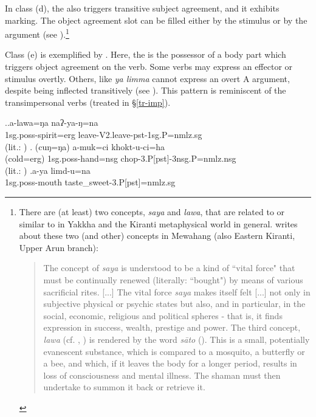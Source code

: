 In class (d), the  also triggers transitive subject agreement, and it exhibits  marking. The object agreement slot can be filled either by  the stimulus  or by the  argument (see \Next[a]).\footnote{There are (at least) two concepts, \emph{saya} and \emph{lawa}, that are related to or similar to  in Yakkha and the Kiranti metaphysical world in general.  \citet{Gaenszle2000Origins} writes about these two (and other) concepts in Mewahang (also Eastern Kiranti, Upper Arun branch): 

\begin{quote}
The concept of \emph{saya} is understood to be a kind of “vital force" that must be continually renewed (literally: “bought") by means of various sacrificial rites. [...] The vital force \emph{saya} makes itself felt [...] not only in subjective physical or psychic states but also, and in particular, in the social, economic, religious and political spheres - that is, it finds expression in success, wealth, prestige and power. The third concept, \emph{lawa} (cf. \citet[165]{Hardman1981The-psychology}, \citet[299]{Hardman_phd_Conformity}) is rendered by the  word \emph{sāto} (). This is a small, potentially evanescent substance, which is compared to a mosquito, a butterfly or a bee, and which, if it leaves the body for a longer period, results in loss of consciousness and mental illness. The shaman must then undertake to summon it back or retrieve it. \citep[119]{Gaenszle2000Origins} 
\end{quote}
}

Class (e) is exemplified by \Next[b]. Here, the  is the possessor of a body part  which triggers object agreement on the verb. Some verbs may express an effector or stimulus overtly. Others, like \emph{ya limma}  cannot express an overt A argument, despite being inflected transitively (see \Next[c]). This pattern is reminiscent of the transimpersonal verbs (treated in §\ref{tr-imp}).

 \ex.\ag.\label{ex-lawa}a-lawa=ŋa naʔ-ya-ŋ=na\\
 {\sc 1sg.poss-}spirit{\sc =erg} leave{\sc -V2.leave-pst-1sg.P=nmlz.sg}\\
  (lit.: )
 \bg. (cuŋ=ŋa) a-muk=ci khokt-u-ci=ha\\
 (cold{\sc =erg}) {\sc 1sg.poss-}hand{\sc =nsg} chop{\sc -3.P[pst]-3nsg.P=nmlz.nsg}\\
 (lit.: )
\bg.a-ya limd-u=na\\
{\sc 1sg.poss-}mouth taste\_sweet{\sc -3.P[pst]=nmlz.sg}\\

